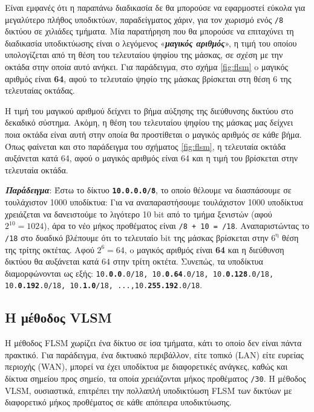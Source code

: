 \documentclass{EdipyLabs} %
\begin{document}
Είναι εμφανές ότι η παραπάνω διαδικασία δε θα μπορούσε να εφαρμοστεί εύκολα για μεγαλύτερο πλήθος υποδικτύων, παραδείγματος χάριν, για τον χωρισμό ενός \texttt{/8} δικτύου σε χιλιάδες τμήματα. Μία παρατήρηση που θα μπορούσε να επιταχύνει τη διαδικασία υποδικτύωσης είναι ο λεγόμενος «\textit{\textbf{μαγικός αριθμός}}», η τιμή του οποίου υπολογίζεται από τη θέση του τελευταίου ψηφίου της μάσκας, σε σχέση με την οκτάδα στην οποία αυτό ανήκει. Για παράδειγμα, στο σχήμα \ref{fig:flsm} o μαγικός αριθμός είναι \textbf{64}, αφού το τελευταίο ψηφίο της μάσκας βρίσκεται στη θέση 6 της τελευταίας οκτάδας. 

Η τιμή του μαγικού αριθμού δείχνει το βήμα αύξησης της διεύθυνσης δικτύου στο δεκαδικό σύστημα. Ακόμη, η θέση του τελευταίου ψηφίου της μάσκας μας δείχνει ποια οκτάδα είναι αυτή στην οποία θα προστίθεται ο μαγικός αριθμός σε κάθε βήμα. Όπως φαίνεται και στο παράδειγμα του σχήματος \ref{fig:flsm}, η τελευταία οκτάδα αυξάνεται κατά 64, αφού ο μαγικός αριθμός είναι 64 και η τιμή του βρίσκεται στην τελευταία οκτάδα.

\textit{\textbf{Παράδειγμα}}: Έστω το δίκτυο \textbf{\texttt{10.0.0.0/8}}, το οποίο θέλουμε να διασπάσουμε σε τουλάχιστον 1000 υποδίκτυα: Για να αναπαραστήσουμε τουλάχιστον 1000 υποδίκτυα χρειάζεται να δανειστούμε το λιγότερο 10 bit από το τμήμα ξενιστών (αφού $2^{10}=1024$), άρα το νέο μήκος προθέματος είναι \texttt{/8 + 10 = /18}. Αναπαριστώντας το \texttt{/18} στο δυαδικό βλέπουμε ότι το τελευταίο bit της μάσκας βρίσκεται στην $6^\text{η}$ θέση της τρίτης οκτέτας. Αφού $2^6=64$, o μαγικός αριθμός είναι \textbf{64} και η διεύθυνση δικτύου θα αυξάνεται κατά $64$ στην τρίτη οκτέτα. Συνεπώς, τα υποδίκτυα διαμορφώνονται ως εξής: \texttt{10.\textbf{0.0}.0/18, 10.\textbf{0.64}.0/18, 10.\textbf{0.128}.0/18, 10.\textbf{0.192}.0/18, 10.\textbf{1.0}/18, ...,10.\textbf{255.192}.0/18}.

\subsection{Η μέθοδος VLSM}

Η μέθοδος FLSM χωρίζει ένα δίκτυο σε ίσα τμήματα, κάτι το οποίο δεν είναι πάντα πρακτικό. Για παράδειγμα, ένα δικτυακό περιβάλλον, είτε τοπικό (LAN) είτε ευρείας περιοχής (WAN), μπορεί να έχει υποδίκτυα με διαφορετικές ανάγκες, καθώς και δίκτυα σημείου προς σημείο, τα οποία χρειάζονται μήκος προθέματος \texttt{/30}. Η μέθοδος VLSM, ουσιαστικά, επιτρέπει την πολλαπλή υποδικτύωση FLSM των δικτύων με διαφορετικό μήκος προθέματος σε κάθε απόπειρα υποδικτύωσης.
\end{document}
